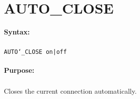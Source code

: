 
\newpage
\section{AUTO\_CLOSE}
\label{cmd:AUTO_CLOSE}

\paragraph{Syntax:}
\subparagraph{}
\texttt{AUTO\char`\_CLOSE on|off}

\paragraph{Purpose:}
\subparagraph{}
Closes the current connection automatically.